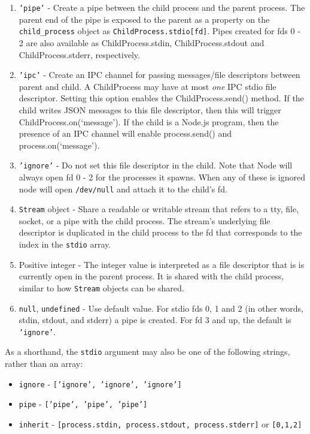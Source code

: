 \begin{enumerate}[1.]
\item
  \texttt{'pipe'} - Create a pipe between the child process and the
  parent process. The parent end of the pipe is exposed to the parent as
  a property on the \texttt{child\_process} object as
  \texttt{ChildProcess.stdio{[}fd{]}}. Pipes created for fds 0 - 2 are
  also available as ChildProcess.stdin, ChildProcess.stdout and
  ChildProcess.stderr, respectively.
\item
  \texttt{'ipc'} - Create an IPC channel for passing messages/file
  descriptors between parent and child. A ChildProcess may have at most
  \emph{one} IPC stdio file descriptor. Setting this option enables the
  ChildProcess.send() method. If the child writes JSON messages to this
  file descriptor, then this will trigger ChildProcess.on(`message'). If
  the child is a Node.js program, then the presence of an IPC channel
  will enable process.send() and process.on(`message').
\item
  \texttt{'ignore'} - Do not set this file descriptor in the child. Note
  that Node will always open fd 0 - 2 for the processes it spawns. When
  any of these is ignored node will open \texttt{/dev/null} and attach
  it to the child's fd.
\item
  \texttt{Stream} object - Share a readable or writable stream that
  refers to a tty, file, socket, or a pipe with the child process. The
  stream's underlying file descriptor is duplicated in the child process
  to the fd that corresponds to the index in the \texttt{stdio} array.
\item
  Positive integer - The integer value is interpreted as a file
  descriptor that is is currently open in the parent process. It is
  shared with the child process, similar to how \texttt{Stream} objects
  can be shared.
\item
  \texttt{null}, \texttt{undefined} - Use default value. For stdio fds
  0, 1 and 2 (in other words, stdin, stdout, and stderr) a pipe is
  created. For fd 3 and up, the default is \texttt{'ignore'}.
\end{enumerate}

As a shorthand, the \texttt{stdio} argument may also be one of the
following strings, rather than an array:

\begin{itemize}
\item
  \texttt{ignore} - \texttt{{[}'ignore', 'ignore', 'ignore'{]}}
\item
  \texttt{pipe} - \texttt{{[}'pipe', 'pipe', 'pipe'{]}}
\item
  \texttt{inherit} -
  \texttt{{[}process.stdin, process.stdout, process.stderr{]}} or
  \texttt{{[}0,1,2{]}}
\end{itemize}

